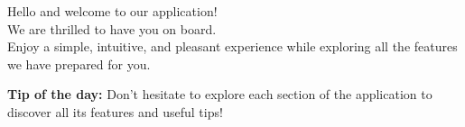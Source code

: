 \documentclass[12pt,a4paper]{article}
\begin{document}
\begin{tcolorbox}[colback=blue!10!white,colframe=blue!60!black,title=\Huge Welcome!,sharp corners]
\begin{center}
\Huge Hello and welcome to our application! \\
\vspace{0.5cm}
\Large We are thrilled to have you on board. \\
Enjoy a simple, intuitive, and pleasant experience while exploring all the features we have prepared for you.
\end{center}
\end{tcolorbox}

\vspace{1cm}

\noindent
\textbf{Tip of the day:} Don't hesitate to explore each section of the application to discover all its features and useful tips!  

\vfill
\end{document}
